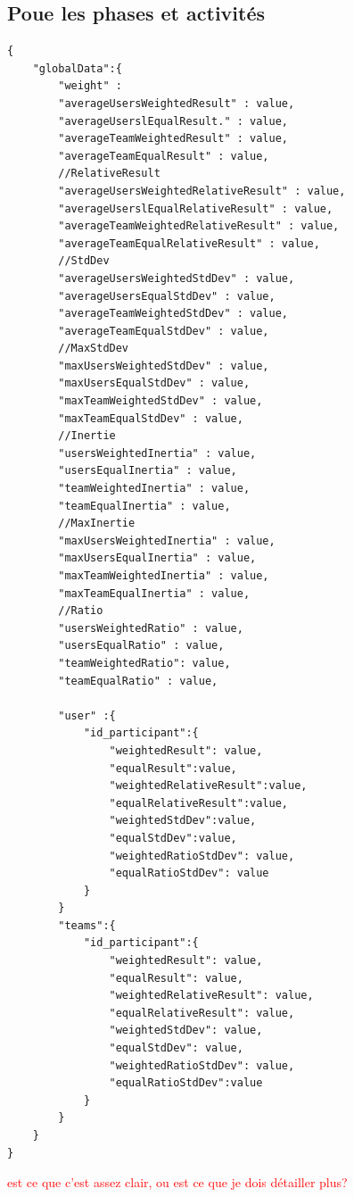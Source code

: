 \documentclass[colorised, sobre]{template} %
\begin{document}
    \subsection{Poue les phases et activités}
        \begin{lstlisting}
{
    "globalData":{
        "weight" : 
        "averageUsersWeightedResult" : value,
        "averageUserslEqualResult." : value,
        "averageTeamWeightedResult" : value,
        "averageTeamEqualResult" : value,
        //RelativeResult
        "averageUsersWeightedRelativeResult" : value,
        "averageUserslEqualRelativeResult" : value,
        "averageTeamWeightedRelativeResult" : value, 
        "averageTeamEqualRelativeResult" : value,
        //StdDev
        "averageUsersWeightedStdDev" : value,
        "averageUsersEqualStdDev" : value,
        "averageTeamWeightedStdDev" : value,
        "averageTeamEqualStdDev" : value,
        //MaxStdDev
        "maxUsersWeightedStdDev" : value,
        "maxUsersEqualStdDev" : value,
        "maxTeamWeightedStdDev" : value,
        "maxTeamEqualStdDev" : value,
        //Inertie 
        "usersWeightedInertia" : value,
        "usersEqualInertia" : value,
        "teamWeightedInertia" : value,
        "teamEqualInertia" : value,
        //MaxInertie
        "maxUsersWeightedInertia" : value,
        "maxUsersEqualInertia" : value,
        "maxTeamWeightedInertia" : value,
        "maxTeamEqualInertia" : value,
        //Ratio
        "usersWeightedRatio" : value,
        "usersEqualRatio" : value,
        "teamWeightedRatio": value,
        "teamEqualRatio" : value,

        "user" :{
            "id_participant":{
                "weightedResult": value,
                "equalResult":value,
                "weightedRelativeResult":value,
                "equalRelativeResult":value,
                "weightedStdDev":value,
                "equalStdDev":value,
                "weightedRatioStdDev": value,
                "equalRatioStdDev": value
            }
        }
        "teams":{
            "id_participant":{
                "weightedResult": value,
                "equalResult": value,
                "weightedRelativeResult": value,
                "equalRelativeResult": value,
                "weightedStdDev": value,
                "equalStdDev": value,
                "weightedRatioStdDev": value,
                "equalRatioStdDev":value
            }
        }
    } 
}                        
        \end{lstlisting}
    \textcolor{red}{est ce que c'est assez clair, ou est ce que je dois détailler plus?}
\end{document}
